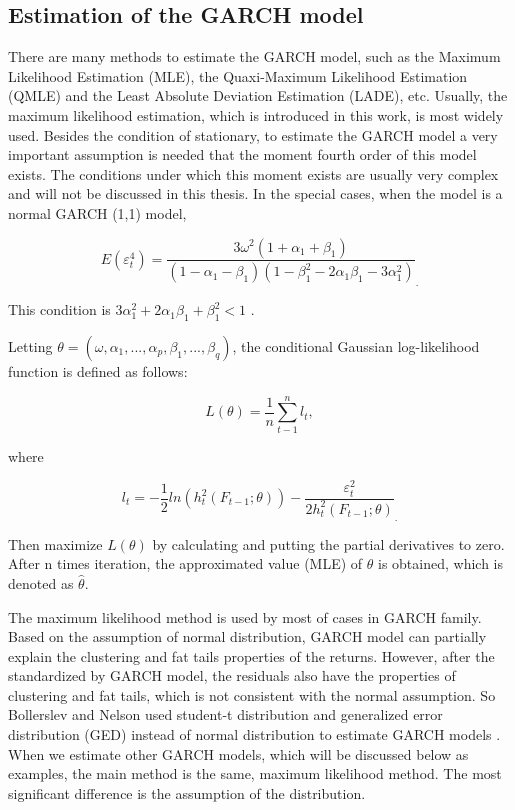\subsection{Estimation of the GARCH model}

There are many methods to estimate the GARCH model, such as the Maximum Likelihood Estimation (MLE), the Quaxi-Maximum Likelihood Estimation (QMLE) and the Least Absolute Deviation Estimation (LADE), etc. Usually, the maximum likelihood estimation, which is introduced in this work, is most widely used. Besides the condition of stationary, to estimate the GARCH model a very important assumption is needed that the moment fourth order of this model exists. The conditions under which this moment exists are usually very complex and will not be discussed in this thesis. In the special cases, when the model is a normal GARCH (1,1) model,
 
\begin{equation}
E(\varepsilon_t^4)=\frac{3\omega^2(1+\alpha_1+\beta_1)}{(1-\alpha_1-\beta_1)(1-\beta_1^2-2\alpha_1\beta_1-3\alpha_1^2)}_.
\end{equation}

This condition is $3\alpha_1^2+2\alpha_1\beta_1+\beta_1^2<1$ \citep{Milhj2012}.  

Letting  $\theta=(\omega, \alpha_1, ..., \alpha_p,\beta_1,..., \beta_q)$, the conditional Gaussian log-likelihood function is defined as follows:

\begin{equation}
 L(\theta) = \frac{1}{n}\sum_{t-1}^nl_t,
\end{equation}

where

\begin{equation}
l_t =-\frac{1}{2}ln(h_t^2(F_{t-1};\theta))-\frac{\varepsilon_t^2}{2h_t^2(F_{t-1};\theta)}_.
\end{equation}

Then maximize $L(\theta)$ by calculating and putting the partial derivatives to zero. After n times iteration, the approximated value (MLE) of $\theta$ is obtained, which is denoted as $\hat{\theta}$.

The maximum likelihood method is used by most of cases in GARCH family. Based on the assumption of normal distribution, GARCH model can partially explain the clustering and fat tails properties of the returns. However, after the standardized by GARCH model, the residuals also have the properties of clustering and fat tails, which is not consistent with the normal assumption. So Bollerslev and Nelson used student-t distribution and generalized error distribution (GED) instead of normal distribution to estimate GARCH models \citep{Bollerslev1986,Nelson1991}. When we estimate other GARCH models, which will be discussed below as examples, the main method is the same, maximum likelihood method. The most significant difference is the assumption of the distribution. 

